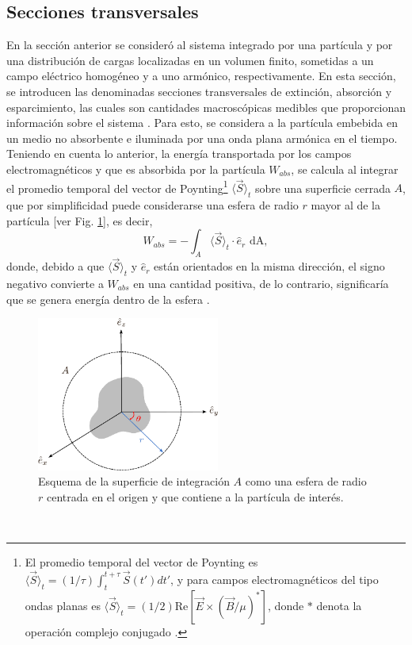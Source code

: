 \hypertarget{Cext}{\subsection{Secciones transversales}}

En la sección anterior se consideró al sistema integrado por una partícula y por una distribución de cargas localizadas en un volumen finito, sometidas a un campo eléctrico homogéneo y a uno armónico, respectivamente. En esta sección, se introducen las denominadas secciones transversales de extinción, absorción y esparcimiento, las cuales son cantidades macroscópicas medibles que proporcionan información sobre el sistema \cite{Bohren}. Para esto, se considera a la partícula embebida en un medio no absorbente e iluminada por una onda plana armónica en el tiempo. Teniendo en cuenta lo anterior, la energía transportada por los campos electromagnéticos y que es absorbida por la partícula $W_{abs}$, se calcula al integrar el promedio temporal del vector de Poynting\footnote{El promedio temporal del vector de Poynting es $\langle\Vec{S}\rangle_t = (1/\tau)\int_t^{t+\tau}\Vec{S}(t')dt'$, y para campos electromagnéticos del tipo ondas planas es $\langle\Vec{S}\rangle_t = (1/2) \text{Re}[\Vec{E} \times (\Vec{B}/\mu)^{*}]$, donde $*$ denota la operación complejo conjugado \cite{Bohren}. } $\langle\Vec{S}\rangle_t$  sobre una superficie cerrada $A$, que por simplificidad puede considerarse una esfera de radio $r$ mayor al de la partícula [ver Fig. \ref{WA}], es decir, 
\begin{equation*}
	W_{abs}=-\int_A \langle\Vec{S}\rangle_t\cdot\hat{e}_r \text{ dA},
	\label{flujopoynting}
\end{equation*}
donde, debido a que $\langle\Vec{S}\rangle_t$ y $\hat{e}_r$ están orientados en la misma dirección, el signo negativo convierte a $W_{abs}$ en una cantidad positiva, de lo contrario, significaría que se genera energía dentro de la esfera \cite{Bohren}.
\begin{figure}[h]
	\centering
	\includegraphics[width=6cm]{../../Figuras/WA.pdf}
	\caption{Esquema de la superficie de integración $A$ como una esfera de radio $r$ centrada en el origen y que contiene a la partícula de interés.}
	\label{WA}
\end{figure}
\\

